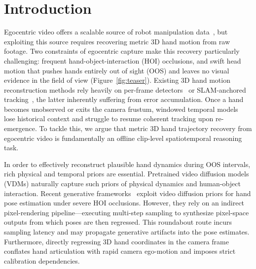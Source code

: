 \documentclass[10pt,twocolumn,letterpaper]{article}
\begin{document}
\section{Introduction}
Egocentric video offers a scalable source of robot manipulation data~\citep{egomimic2024,egovla2025,egodex2025,li2026aceego0unifyingegocentrichuman}, but exploiting this source requires recovering metric 3D hand motion from raw footage. 
Two constraints of egocentric capture make this recovery particularly challenging: frequent hand-object-interaction (HOI) occlusions, and swift head motion that pushes hands entirely out of sight (OOS) and leaves no visual evidence in the field of view (Figure~\ref{fig:teaser}).
Existing 3D hand motion reconstruction methods rely heavily on per-frame detectors~\citep{hamer2024,wilor2025,interwild2023,wildhands2024,hamba2024} or SLAM-anchored tracking~\citep{hawor2025,dynhamr2025,tram2024,slahmr2023}, the latter inherently suffering from error accumulation. Once a hand becomes unobserved or exits the camera frustum, windowed temporal models~\citep{omnihands2025,tcmr2021,glot2023} lose historical context and struggle to resume coherent tracking upon re-emergence. 
To tackle this, we argue that metric 3D hand trajectory recovery from egocentric video is fundamentally an offline clip-level spatiotemporal reasoning task.

In order to effectively reconstruct plausible hand dynamics during OOS intervals, rich physical and temporal priors are essential. 
Pretrained video diffusion models (VDMs) naturally capture such priors of physical dynamics and human-object interaction.  
Recent generative frameworks~\cite{vidihand2026} exploit video diffusion priors for hand pose estimation under severe HOI occlusions. 
However, they rely on an indirect pixel-rendering pipeline—executing multi-step sampling to synthesize pixel-space outputs from which poses are then regressed. 
This roundabout route incurs sampling latency and may propagate generative artifacts into the pose estimates. 
Furthermore, directly regressing 3D hand coordinates in the camera frame conflates hand articulation with rapid camera ego-motion and imposes strict calibration dependencies. 
\end{document}
